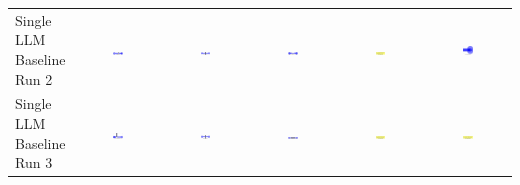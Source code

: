 \begin{table}
\begin{tabular}{@{}lccccc@{}}
    \makecell{Single LLM \\ Baseline \\ Run 2} & \includegraphics[width=0.13\textwidth]{./run_2/png/gpt-4o_results/DLDChip.png} & \includegraphics[width=0.13\textwidth]{./run_2/png/o1-preview_results/DLDChip.png} & \includegraphics[width=0.13\textwidth]{./run_2/png/claude-3-5-sonnet-20240620_results/DLDChip.png} & \includegraphics[width=0.13\textwidth]{./run_2/png/watsonx_meta-llama_llama-3-1-70b-instruct_results/DLDChip.png} & \includegraphics[width=0.13\textwidth]{./run_2/png/watsonx_meta-llama_llama-3-405b-instruct_results/DLDChip.png} \\
    \makecell{Single LLM \\ Baseline \\ Run 3} & \includegraphics[width=0.13\textwidth]{./run_3/png/gpt-4o_results/DLDChip.png} & \includegraphics[width=0.13\textwidth]{./run_3/png/o1-preview_results/DLDChip.png} & \includegraphics[width=0.13\textwidth]{./run_3/png/claude-3-5-sonnet-20240620_results/DLDChip.png} & \includegraphics[width=0.13\textwidth]{./run_3/png/watsonx_meta-llama_llama-3-1-70b-instruct_results/DLDChip.png} & \includegraphics[width=0.13\textwidth]{./run_3/png/watsonx_meta-llama_llama-3-405b-instruct_results/DLDChip.png} \\

\end{tabular}
\end{table}
